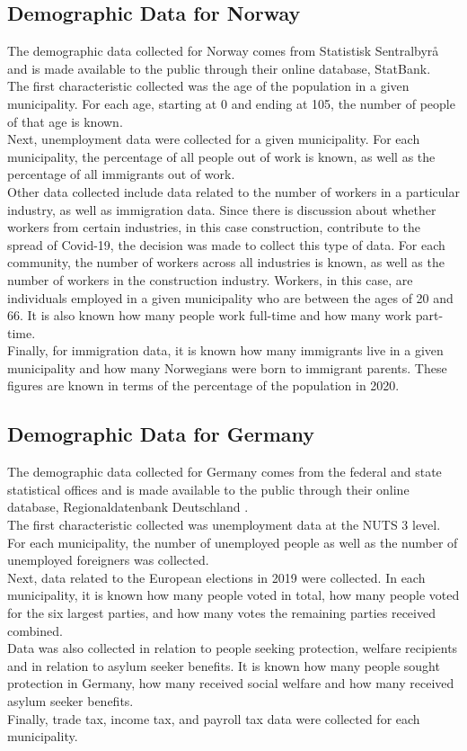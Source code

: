 \subsection{Demographic Data for Norway}
The demographic data collected for Norway comes from Statistisk Sentralbyrå and is made available to the public through their online database, StatBank\cite{ssb}. \\
The first characteristic collected was the age of the population in a given municipality. For each age, starting at 0 and ending at 105, the number of people of that age is known. \\
Next, unemployment data were collected for a given municipality. For each municipality, the percentage of all people out of work is known, as well as the percentage of all immigrants out of work. \\
Other data collected include data related to the number of workers in a particular industry, as well as immigration data. Since there is discussion about whether workers from certain industries, in this case construction, contribute to the spread of Covid-19, the decision was made to collect this type of data. For each community, the number of workers across all industries is known, as well as the number of workers in the construction industry. Workers, in this case, are individuals employed in a given municipality who are between the ages of 20 and 66. It is also known how many people work full-time and how many work part-time. \\
Finally, for immigration data, it is known how many immigrants live in a given municipality and how many Norwegians were born to immigrant parents. These figures are known in terms of the percentage of the population in 2020.
\subsection{Demographic Data for Germany}
The demographic data collected for Germany comes from the federal and state statistical offices and is made available to the public through their online database, Regionaldatenbank Deutschland \cite{rdb}. \\
The first characteristic collected was unemployment data at the NUTS 3 level. For each municipality, the number of unemployed people as well as the number of unemployed foreigners was collected. \\
Next, data related to the European elections in 2019 were collected. In each municipality, it is known how many people voted in total, how many people voted for the six largest parties, and how many votes the remaining parties received combined. \\
Data was also collected in relation to people seeking protection, welfare recipients and in relation to asylum seeker benefits. It is known how many people sought protection in Germany, how many received social welfare and how many received asylum seeker benefits. \\
Finally, trade tax, income tax, and payroll tax data were collected for each municipality. 
\clearpage
